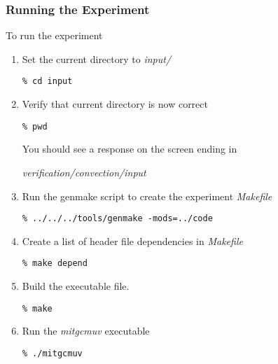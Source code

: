 \subsubsection{Running the Experiment}

 To run the experiment

\begin{enumerate}
\item Set the current directory to {\it input/ }

\begin{verbatim}
% cd input
\end{verbatim}

\item Verify that current directory is now correct

\begin{verbatim}
% pwd
\end{verbatim}

 You should see a response on the screen ending in

{\it verification/convection/input }


\item Run the genmake script to create the experiment {\it Makefile}

\begin{verbatim}
% ../../../tools/genmake -mods=../code
\end{verbatim}

\item Create a list of header file dependencies in {\it Makefile}

\begin{verbatim}
% make depend
\end{verbatim}

\item Build the executable file.

\begin{verbatim}
% make
\end{verbatim}

\item Run the {\it mitgcmuv} executable

\begin{verbatim}
% ./mitgcmuv
\end{verbatim}

\end{enumerate}


